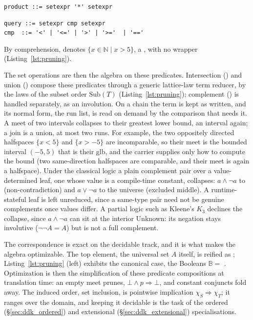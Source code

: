 \documentclass[11pt, a4paper]{article}
\begin{document}
\begin{listing}[htbp]
\vspace{0.6em}
\noindent
\begin{minipage}[t]{0.49\linewidth}
\begin{verbatim}
product ::= setexpr '*' setexpr
\end{verbatim}
\end{minipage}\hfill
\begin{minipage}[t]{0.49\linewidth}
\begin{verbatim}
query ::= setexpr cmp setexpr
cmp  ::= '<' | '<=' | '>' | '>='  | '=='
\end{verbatim}
\end{minipage}
\end{listing}

By comprehension,  denotes $\{x \in \mathbb{N} \mid x > 5\}$, a , with no wrapper (Listing~\ref{lst:pruning}).

The set operations are then the algebra on these predicates.
Intersection (\cppinline{&}) and union (\cppinline{|}) compose these predicates through a generic lattice-law term reducer, by the laws of the subset order $\mathrm{Sub}(T)$ (Listing~\ref{lst:pruning}); complement (\cppinline{~}) is handled separately, as an involution.
On a chain the term is kept as written, and its normal form, the run list, is read on demand by the comparison that needs it.
A meet of two intervals collapses to their greatest lower bound, an interval again; a join is a union, at most two runs.
For example, the two oppositely directed halfspaces $\{x < 5\}$ and $\{x > -5\}$ are incomparable, so their meet is the bounded interval $(-5, 5)$ that is their glb, and the carrier supplies only how to compute the bound (two same-direction halfspaces are comparable, and their meet is again a halfspace).
Under the classical logic a plain complement pair over a value-determined leaf, one whose value is a compile-time constant, collapses: $a \wedge \neg a$ to  (non-contradiction) and $a \vee \neg a$ to the universe (excluded middle).
A runtime-stateful leaf is left unreduced, since a same-type pair need not be genuine complements once values differ.
A partial logic such as Kleene's $K_3$ declines the collapse, since $a \wedge \neg a$ can sit at the interior Unknown: its negation stays involutive ($\neg\neg A = A$) but is not a full complement.

The correspondence is exact on the decidable track, and it is what makes the algebra optimizable.
The top element, the universal set $A$ itself, is reified as ; Listing~\ref{lst:pruning} (left) exhibits the canonical case, the Booleans $\mathbb{B} = $ .
Optimization is then the simplification of these predicate compositions at translation time: an empty meet prunes, $\bot \wedge p \Rightarrow \bot$, and constant conjuncts fold away.
The induced order, set inclusion, is pointwise implication $\chi_S \Rightarrow \chi_T$; it ranges over the domain, and keeping it decidable is the task of the ordered (§\ref{sec:ddk_ordered}) and extensional (§\ref{sec:ddk_extensional}) specialisations.
\end{document}
